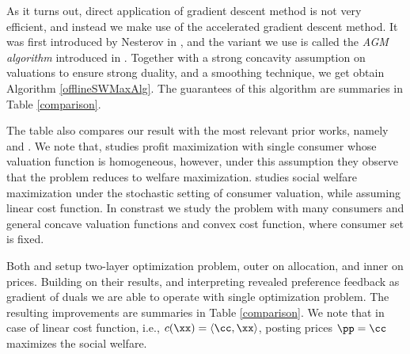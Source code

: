 As it turns out, direct application of gradient descent method is not very efficient, and instead we make use of the accelerated gradient descent method. It was first introduced by Nesterov in \cite{N83}, and the variant we use is called the {\em AGM algorithm} introduced in \cite{AO14}. Together with a strong concavity assumption on valuations to ensure strong duality, and a smoothing technique, we get obtain Algorithm \ref{offlineSWMaxAlg}. The guarantees of this algorithm are summaries in Table \ref{comparison}.

The table also compares our result with the most relevant prior works, namely \cite{RUW16} and \cite{RSUW17}. 
We note that, \cite{RUW16} studies profit maximization with single consumer whose valuation function is homogeneous, however, under this assumption they observe that the problem reduces to welfare maximization. \cite{RSUW17} studies social welfare maximization under the stochastic setting of consumer valuation, while assuming linear cost function. %
In constrast we study the problem with many consumers and general concave valuation functions and convex cost function, where consumer set is fixed. %

Both \cite{RUW16} and \cite{RSUW17} setup two-layer optimization problem, outer on allocation, and inner on prices. Building on their results, and interpreting revealed preference feedback as gradient of duals we are able to operate with single optimization problem. The resulting improvements are summaries in Table \ref{comparison}. We note that in case of linear cost function, i.e., $c(\xx)=\langle \cc, \xx\rangle$, posting prices $\pp=\cc$ maximizes the social welfare. %

